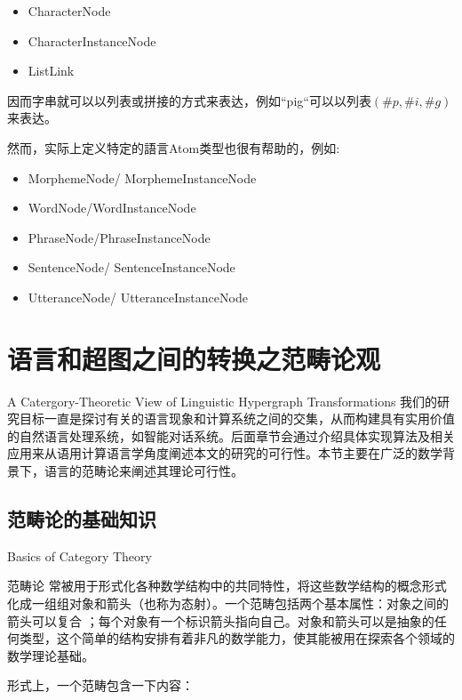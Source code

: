 \begin{itemize}
\item CharacterNode
\item CharacterInstanceNode
\item ListLink
\end{itemize}

\noindent 因而字串就可以以列表或拼接的方式来表达，例如“pig“可以以列表$(\#p, \#i, \#g)$来表达。

然而，实际上定义特定的語言Atom类型也很有帮助的，例如:

\begin{itemize}
\item  	MorphemeNode/ MorphemeInstanceNode
\item		WordNode/WordInstanceNode
\item		PhraseNode/PhraseInstanceNode
\item		SentenceNode/ SentenceInstanceNode
\item		UtteranceNode/ UtteranceInstanceNode
\end{itemize}


\section{语言和超图之间的转换之范畴论观}{A Catergory-Theoretic View of Linguistic Hypergraph Transformations}
我们的研究目标一直是探讨有关的语言现象和计算系统之间的交集，从而构建具有实用价值的自然语言处理系统，如智能对话系统。后面章节会通过介绍具体实现算法及相关应用来从语用计算语言学角度阐述本文的研究的可行性。本节主要在广泛的数学背景下，语言的范畴论来阐述其理论可行性。

\subsection{范畴论的基础知识}{Basics of Category Theory}

范畴论 \cite{LawvereSchanuel97}常被用于形式化各种数学结构中的共同特性，将这些数学结构的概念形式化成一组组对象和箭头（也称为态射）。一个范畴包括两个基本属性：对象之间的箭头可以复合 ；每个对象有一个标识箭头指向自己。对象和箭头可以是抽象的任何类型，这个简单的结构安排有着非凡的数学能力，使其能被用在探索各个领域的数学理论基础。

形式上，一个范畴包含一下内容：

